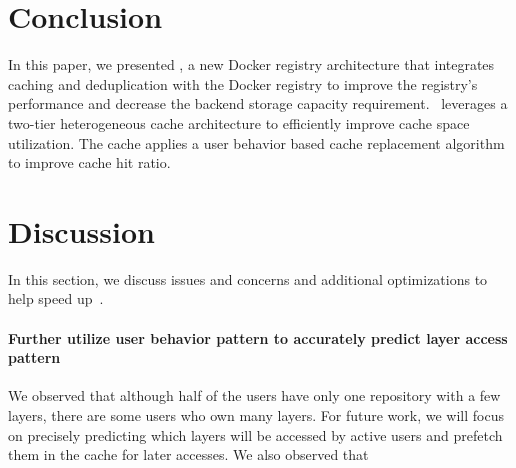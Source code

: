 \section{Conclusion}
\label{sec:conclusion}
In this paper, we presented \sysname, a new Docker registry architecture that integrates caching and deduplication with the Docker registry to
improve the registry's performance and decrease the backend storage capacity requirement. 
\sysname~leverages a two-tier heterogeneous cache architecture to efficiently improve cache space 
utilization. The cache applies a user behavior based cache replacement algorithm to improve cache hit ratio.


\section{Discussion}
\label{sec:discussion}
In this section, we discuss issues and concerns 
and additional optimizations to help speed up~\sysname.
\paragraph{Further utilize user behavior pattern to accurately predict layer access pattern}
We observed that although half of the users have only one repository with a few layers, there are some users who own many layers. 
For future work, we will focus on precisely predicting which layers will be accessed by active users and prefetch them in the cache for later accesses.
We also observed that 

